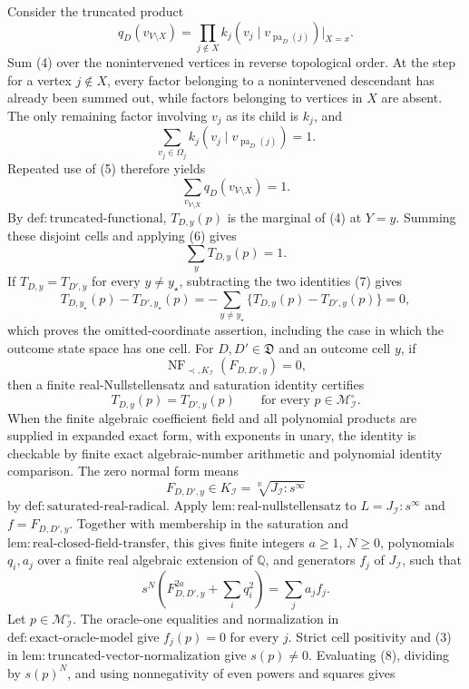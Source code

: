 Consider the truncated product
\[
 q_D(v_{V\setminus X})
 =\prod_{j\notin X}k_j(v_j\mid v_{\operatorname{pa}_D(j)})\big|_{X=x}. \tag{4}
\]
Sum (4) over the nonintervened vertices in reverse topological order.  At the step for a vertex \(j\notin X\), every factor belonging to a nonintervened descendant has already been summed out, while factors belonging to vertices in \(X\) are absent.  The only remaining factor involving \(v_j\) as its child is \(k_j\), and
\[
 \sum_{v_j\in\Omega_j}k_j(v_j\mid v_{\operatorname{pa}_D(j)})=1. \tag{5}
\]
Repeated use of (5) therefore yields
\[
 \sum_{v_{V\setminus X}}q_D(v_{V\setminus X})=1. \tag{6}
\]
By \(\mathrm{def{:}truncated\text{-}functional}\), \(T_{D,y}(p)\) is the marginal of (4) at \(Y=y\).  Summing these disjoint cells and applying (6) gives
\[
 \sum_yT_{D,y}(p)=1. \tag{7}
\]
If \(T_{D,y}=T_{D',y}\) for every \(y\neq y_\star\), subtracting the two identities (7) gives
\[
 T_{D,y_\star}(p)-T_{D',y_\star}(p)
 =-\sum_{y\neq y_\star}\{T_{D,y}(p)-T_{D',y}(p)\}=0,
\]
which proves the omitted-coordinate assertion, including the case in which the outcome state space has one cell.
For \(D,D'\in\mathfrak D\) and an outcome cell \(y\), if
\[
 \operatorname{NF}_{\prec,K_{\mathcal I}}(F_{D,D',y})=0,
\]
then a finite real-Nullstellensatz and saturation identity certifies
\[
 T_{D,y}(p)=T_{D',y}(p)
 \qquad\text{for every }p\in\mathcal M_{\mathcal I}^{\circ}.
\]
When the finite algebraic coefficient field and all polynomial products are supplied in expanded exact form, with exponents in unary, the identity is checkable by finite exact algebraic-number arithmetic and polynomial identity comparison.
The zero normal form means
\[
 F_{D,D',y}\in K_{\mathcal I}
 =\sqrt[\mathbb R]{J_{\mathcal I}:s^\infty}
\]
by \(\mathrm{def{:}saturated\text{-}real\text{-}radical}\).  Apply \(\mathrm{lem{:}real\text{-}nullstellensatz}\) to \(L=J_{\mathcal I}:s^\infty\) and \(f=F_{D,D',y}\).  Together with membership in the saturation and \(\mathrm{lem{:}real\text{-}closed\text{-}field\text{-}transfer}\), this gives finite integers \(a\geq1\), \(N\geq0\), polynomials \(q_i,a_j\) over a finite real algebraic extension of \(\mathbb Q\), and generators \(f_j\) of \(J_{\mathcal I}\), such that
\[
 s^N\left(F_{D,D',y}^{2a}+\sum_iq_i^2\right)
 =\sum_j a_jf_j. \tag{8}
\]
Let \(p\in\mathcal M_{\mathcal I}^{\circ}\).  The oracle-one equalities and normalization in \(\mathrm{def{:}exact\text{-}oracle\text{-}model}\) give \(f_j(p)=0\) for every \(j\).  Strict cell positivity and (3) in \(\mathrm{lem{:}truncated\text{-}vector\text{-}normalization}\) give \(s(p)\neq0\).  Evaluating (8), dividing by \(s(p)^N\), and using nonnegativity of even powers and squares gives
